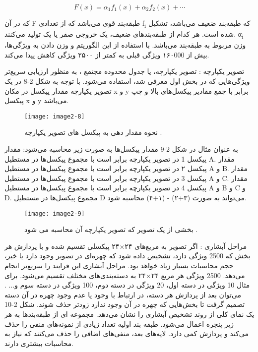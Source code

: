 \begin{equation}\label{eq2-5}
F(x)=α_1 f_1 (x)+α_2 f_2 (x)+⋯
\end{equation}

که در آن F طبقه‌بند قوی می‌باشد که از تعدادی f\textsubscript{i} که طبقه‌بند ضعیف می‌باشد، تشکیل شده است. هر کدام از طبقه‌بندهای ضعیف، یک خروجی صفر یا یک تولید می‌کنند. α\textsubscript{i} وزن مربوط به طبقه‌بند می‌باشد. با استفاده از این الگوریتم و وزن دادن به ویژگی‌ها، بیش از ۱۶۰000 ویژگی قبلی به کمتر از ۲۵۰۰ ویژگی کاهش پیدا می‌کند.

تصویر یکپارچه : تصویر یکپارچه، یا جدول محدوده مجتمع ، به منظور ارزيابی سريع‌تر ویژگی‌هایی که در بخش اول معرفی شد، استفاده می‌شود. با توجه به شکل 2-8 در یک تصویر یکپارچه مقدار پیکسل در مکان x و y برابر با جمع مقادیر پیکسل‌های بالا و چپ پیکسل x و y می‌باشد.

\begin{figure}[h]
\centering
  \texttt{[image: image2-8]}
  \caption{نحوه مقدار دهی به پیکسل های تصویر یکپارچه \cite{ref1}.}
  \label{image2-8}
\end{figure}
به عنوان مثال در شکل 2-9 مقدار پیکسل‌ها به صورت زیر محاسبه می‌شود:
مقدار پیکسل 1 در تصویر یکپارچه برابر است با مجموع پیکسل‌ها در مستطیل A.
مقدار پیکسل ۲ در تصویر یکپارچه برابر است با مجموع پیکسل‌ها در مستطیل A و B.
مقدار پیکسل 3 در تصویر یکپارچه برابر است با مجموع پیکسل‌ها در مستطیل A و C.
مقدار پیکسل 4 در تصویر یکپارچه برابر است با مجموع پیکسل‌ها در مستطیل A و B و C و D.
مجموع پیکسل‌ها در مستطیل D می‌تواند به صورت (۳+۲) - (۱+۴) محاسبه شود.

\begin{figure}[h]
\centering
  \texttt{[image: image2-9]}
  \caption{بخشی از یک تصویر که تصویر یکپارچه آن محاسبه می شود \cite{ref1}.}
  \label{image2-9}
\end{figure}

مراحل آبشاری : اگر تصویر به مربع‌های ۲۴×۲۴ پیکسلی تقسیم شده و با پردازش هر بخش که 2500 ویژگی دارد، تشخیص داده شود که چهره‌ای در تصویر وجود دارد یا خیر، حجم محاسبات بسیار زیاد خواهد بود. مراحل آبشاری این فرایند را سریع‌تر انجام می‌دهد. 2500 ویژگی هر مربع ۲۴×۲۴ به دسته‌بندی‌های مختلف تقسیم می‌شود. برای مثال 10 ویژگی در دسته‌ اول، 20 ویژگی در دسته دوم، 100 ویژگی در دسته سوم و... . می‌توان بعد از پردازش هر دسته، در ارتباط با وجود یا عدم وجود چهره در آن دسته تصمیم گرفت تا بخش‌هایی که چهره در آن وجود ندارد زودتر حذف شوند. شکل 2-10 یک نمای کلی از روند تشخیص آبشاری را نشان می‌دهد. مجموعه ای از طبقه‌بندها به هر زیر پنجره اعمال می‌شود. طبقه بند اولیه تعداد زیادی از نمونه‌های منفی را حذف می‌کند و پردازش کمی دارد. لایه‌های بعد، منفی‌های اضافی را حذف می‌کنند که نیاز به محاسبات بیشتری دارند.

